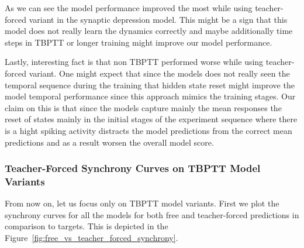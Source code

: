 As we can see the model performance improved the most while using teacher-forced variant in the synaptic depression model. This might be a sign that this model does not really learn the dynamics correctly and maybe additionally time steps in TBPTT or longer training might improve our model performance. 

Lastly, interesting fact is that non TBPTT performed worse while using teacher-forced variant. One might expect that since the models does not really seen the temporal sequence during the training that hidden state reset might improve the model temporal performance since this approach mimics the training stages. Our claim on this is that since the models capture mainly the mean responses the reset of states mainly in the initial stages of the experiment sequence where there is a hight spiking activity distracts the model predictions from the correct mean predictions and as a result worsen the overall model score.

\subsubsection{Teacher-Forced Synchrony Curves on TBPTT Model Variants}
\label{subsubsec:teacher_forced_synchrony_curves_tbptt}
From now on, let us focus only on TBPTT model variants. First we plot the synchrony curves for all the models for both free and teacher-forced predictions in comparison to targets. This is depicted in the Figure~\ref{fig:free_vs_teacher_forced_synchrony}.

